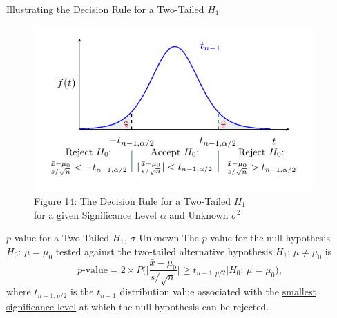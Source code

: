 \documentclass[pdf]{beamer}
\theoremstyle{remark}
\theoremstyle{definition}
\begin{document}
\begin{frame}[t]{Illustrating the Decision Rule for a Two-Tailed $H_1$ }
\begin{figure}[htbp]
    \centering
    \captionsetup{justification=centering}
    \includegraphics[clip, trim=0.5cm 0.5cm 0.0cm 0cm, width=0.95\textwidth]{Hypothesis_Testing_Module_9_t3.pdf}  
    \caption{Figure {\color{franklinblue} 14}: The Decision Rule for a Two-Tailed $H_1$ \\ for a given Significance Level $\alpha$ and Unknown $\sigma^2$}
    \label{fig:gauss6}
\end{figure}
\end{frame}

\begin{frame}[t]{$p$-value  for a Two-Tailed $H_1$, $\sigma$ Unknown}
The $p$-value for the null hypothesis $H_0\text{: }  \mu = \mu_0$ tested against the two-tailed alternative hypothesis $H_1\text{: }  \mu \neq \mu_0$ is \\
\vspace{1.5ex}
\begin{equation}
p\text{-value} = 2 \times P\bigg( \bigg| \frac{\bar{x} - \mu_0}{s/ \sqrt{n}} \bigg| \geq t_{n-1,p/2} | H_0\text{: }  \mu = \mu_0 \bigg),
\end{equation}
where $t_{n-1,p/2}$ is the $t_{n-1}$ distribution value associated with the \underline{smallest significance level} at which the null hypothesis can be rejected. \\
\end{frame}
\end{document}

